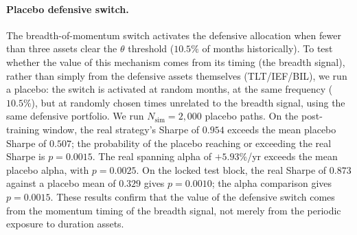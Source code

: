 \paragraph{Placebo defensive switch.}
The breadth-of-momentum switch activates the defensive allocation when fewer than
three assets clear the $\theta$ threshold ($10.5\%$ of months historically).
To test whether the value of this mechanism comes from its timing (the
breadth signal), rather than simply from the defensive assets themselves
(TLT/IEF/BIL), we run a placebo: the switch is activated at random months, at the
same frequency ($10.5\%$), but at randomly chosen times unrelated to the breadth
signal, using the same defensive portfolio. We run $N_{\text{sim}} = 2{,}000$
placebo paths. On the post-training window, the real strategy's Sharpe of $0.954$
exceeds the mean placebo Sharpe of $0.507$; the probability of the placebo reaching
or exceeding the real Sharpe is $p = 0.0015$. The real spanning alpha of $+5.93\%$/yr
exceeds the mean placebo alpha, with $p = 0.0025$. On the locked test block, the
real Sharpe of $0.873$ against a placebo mean of $0.329$ gives $p = 0.0010$;
the alpha comparison gives $p = 0.0015$. These results confirm that the value of
the defensive switch comes from the momentum timing of the breadth signal,
not merely from the periodic exposure to duration assets.
